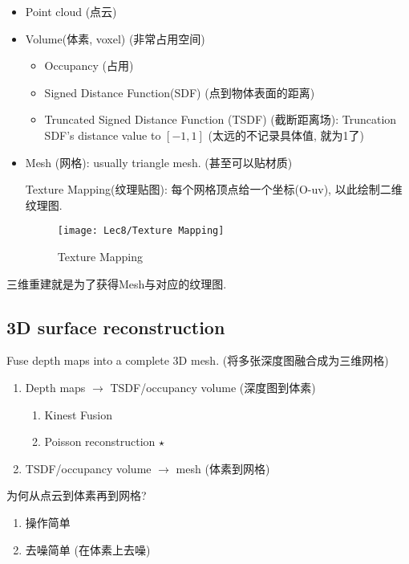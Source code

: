 \begin{itemize}
    \item Point cloud (点云)
    \item Volume(体素, voxel) (非常占用空间)
    \begin{itemize}
        \item Occupancy (占用)
        \item Signed Distance Function(SDF) (点到物体表面的距离) 
        \item Truncated Signed Distance Function (TSDF) (截断距离场): Truncation SDF’s distance value to $[-1, 1]$ (太远的不记录具体值, 就为1了)
    \end{itemize}
    \item Mesh (网格): usually triangle mesh.  (甚至可以贴材质)
    
    Texture Mapping(纹理贴图): 每个网格顶点给一个坐标(O-uv), 以此绘制二维纹理图. 

    \begin{figure}[H]
        \centering
        \texttt{[image: Lec8/Texture Mapping]}
        \caption{Texture Mapping}
    \end{figure}
    
\end{itemize}

三维重建就是为了获得Mesh与对应的纹理图. 

\subsection{3D surface reconstruction}
Fuse depth maps into a complete 3D mesh. (将多张深度图融合成为三维网格)

\begin{enumerate}
    \item Depth maps $\longrightarrow$ TSDF/occupancy volume (深度图到体素)
    \begin{enumerate}
        \item Kinest Fusion
        \item Poisson reconstruction $\star$
    \end{enumerate}
    \item TSDF/occupancy volume $\longrightarrow$ mesh (体素到网格)
\end{enumerate}

为何从点云到体素再到网格? 
\begin{enumerate}
    \item 操作简单
    \item 去噪简单 (在体素上去噪)
\end{enumerate}

